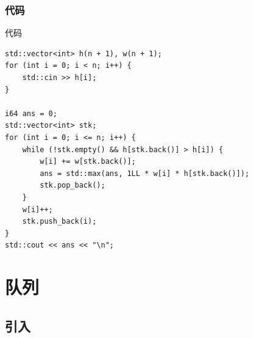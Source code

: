 \documentclass{beamer}
\begin{document}
\subsubsection{代码}
\begin{frame}[fragile]{代码}
    \begin{verbatim}
std::vector<int> h(n + 1), w(n + 1);
for (int i = 0; i < n; i++) {
    std::cin >> h[i];
}

i64 ans = 0;
std::vector<int> stk;
for (int i = 0; i <= n; i++) {
    while (!stk.empty() && h[stk.back()] > h[i]) {
        w[i] += w[stk.back()];
        ans = std::max(ans, 1LL * w[i] * h[stk.back()]);
        stk.pop_back();
    }
    w[i]++;
    stk.push_back(i);
}
std::cout << ans << "\n";
    \end{verbatim}
\end{frame}

\section{队列}
\subsection{引入}
\end{document}
